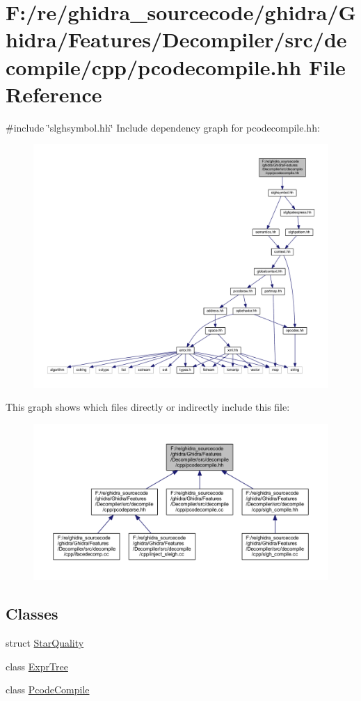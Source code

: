 \hypertarget{pcodecompile_8hh}{}\section{F\+:/re/ghidra\+\_\+sourcecode/ghidra/\+Ghidra/\+Features/\+Decompiler/src/decompile/cpp/pcodecompile.hh File Reference}
\label{pcodecompile_8hh}
{\ttfamily \#include \char`\"{}slghsymbol.\+hh\char`\"{}}\newline
Include dependency graph for pcodecompile.\+hh\+:
\nopagebreak
\begin{figure}[H]
\begin{center}
\leavevmode
\includegraphics[width=350pt]{pcodecompile_8hh__incl}
\end{center}
\end{figure}
This graph shows which files directly or indirectly include this file\+:
\nopagebreak
\begin{figure}[H]
\begin{center}
\leavevmode
\includegraphics[width=350pt]{pcodecompile_8hh__dep__incl}
\end{center}
\end{figure}
\subsection*{Classes}
\begin{DoxyCompactItemize}
\item 
struct \mbox{\hyperlink{struct_star_quality}{Star\+Quality}}
\item 
class \mbox{\hyperlink{class_expr_tree}{Expr\+Tree}}
\item 
class \mbox{\hyperlink{class_pcode_compile}{Pcode\+Compile}}
\end{DoxyCompactItemize}
